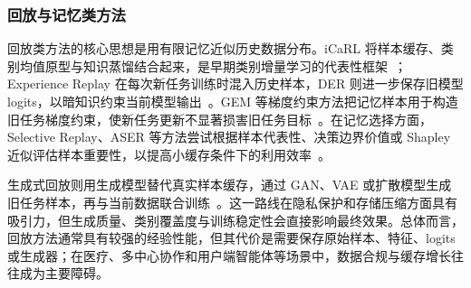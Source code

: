 \subsubsection{回放与记忆类方法}

回放类方法的核心思想是用有限记忆近似历史数据分布。iCaRL 将样本缓存、类别均值原型与知识蒸馏结合起来，是早期类别增量学习的代表性框架~\citep{rebuffi2017icarl}；Experience Replay 在每次新任务训练时混入历史样本，DER 则进一步保存旧模型 logits，以暗知识约束当前模型输出~\citep{rolnick2019experience,buzzega2020dark}。GEM 等梯度约束方法把记忆样本用于构造旧任务梯度约束，使新任务更新不显著损害旧任务目标~\citep{lopez2017gradient,chaudhry2019continual}。在记忆选择方面，Selective Replay、ASER 等方法尝试根据样本代表性、决策边界价值或 Shapley 近似评估样本重要性，以提高小缓存条件下的利用效率~\citep{isele2018selective,ASER}。

生成式回放则用生成模型替代真实样本缓存，通过 GAN、VAE 或扩散模型生成旧任务样本，再与当前数据联合训练~\citep{shin2017continual,goodfellow2014generative,kingma2013auto,gao2023ddgr}。这一路线在隐私保护和存储压缩方面具有吸引力，但生成质量、类别覆盖度与训练稳定性会直接影响最终效果。总体而言，回放方法通常具有较强的经验性能，但其代价是需要保存原始样本、特征、logits 或生成器；在医疗、多中心协作和用户端智能体等场景中，数据合规与缓存增长往往成为主要障碍。


